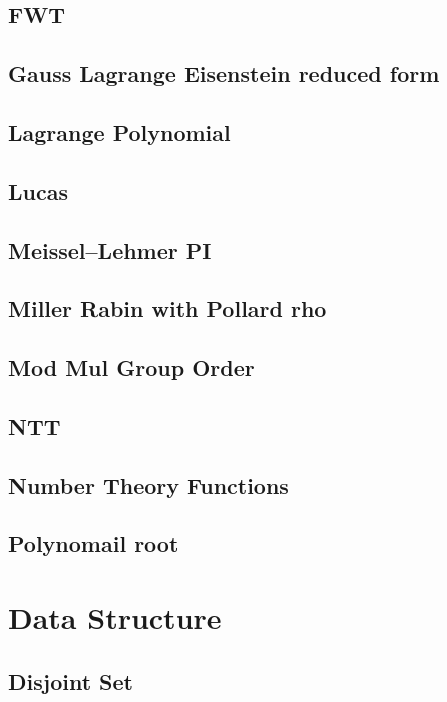 \subsection{FWT}

\subsection{Gauss Lagrange Eisenstein reduced form}

\subsection{Lagrange Polynomial}

\subsection{Lucas}

\subsection{Meissel–Lehmer PI}

\subsection{Miller Rabin with Pollard rho}

\subsection{Mod Mul Group Order}

\subsection{NTT}

\subsection{Number Theory Functions}

\subsection{Polynomail root}


\section{Data Structure}
\subsection{Disjoint Set}

